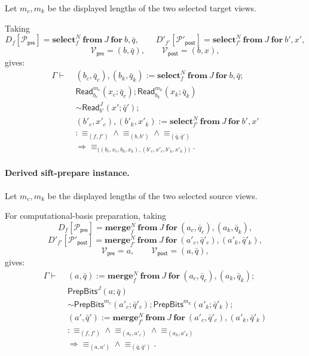 \documentclass[acmsmall,screen,review,anonymous,nonacm]{acmart}
\theoremstyle{defn_style}
\begin{document}
Let \(m_c,m_k\) be the displayed lengths of the two selected target views.

Taking
\[
D_f[\mathcal P_{\mathsf{pre}}]
=
\mathbf{select}_{f}^{N}\ \mathbf{from}\ J\ \mathbf{for}\ b,\bar q,
\qquad
D'_{f'}[\mathcal P'_{\mathsf{post}}]
=
\mathbf{select}_{f'}^{N}\ \mathbf{from}\ J\ \mathbf{for}\ b',x',
\]
\[
\mathcal V_{\mathsf{pre}}=(b,\bar q),
\qquad
\mathcal V_{\mathsf{post}}=(b,x),
\]
gives:
\[
\begin{aligned}
\Gamma
\vdash\;&
(b_c,\bar q_c),(b_k,\bar q_k)
:=
\mathbf{select}_{f}^{N}\ \mathbf{from}\ J\ \mathbf{for}\ b,\bar q;
\\
&
\mathsf{Read}_{b_c}^{m_c}(x_c;\bar q_c);
\mathsf{Read}_{b_k}^{m_k}(x_k;\bar q_k)
\\
&\sim
\mathsf{Read}_{b'}^{J}(x';\bar q');
\\
&
(b'_c,x'_c),(b'_k,x'_k)
:=
\mathbf{select}_{f'}^{N}\ \mathbf{from}\ J\ \mathbf{for}\ b',x'
\\
&:
\equiv_{(f,f')}
\land
\equiv_{(b,b')}
\land
\equiv_{(\bar q,\bar q')}
\\
&\Longrightarrow
\equiv_{\bigl(
(b_c,x_c,b_k,x_k),
(b'_c,x'_c,b'_k,x'_k)
\bigr)} .
\end{aligned}
\]


\paragraph{Derived sift-prepare instance.}

Let \(m_c,m_k\) be the displayed lengths of the two selected source views.

For computational-basis preparation, taking
\[
D_f[\mathcal P_{\mathsf{pre}}]
=
\mathbf{merge}_{f}^{N}\ \mathbf{from}\ J\
\mathbf{for}\ (a_c,\bar q_c),(a_k,\bar q_k),
\]
\[
D'_{f'}[\mathcal P'_{\mathsf{post}}]
=
\mathbf{merge}_{f'}^{N}\ \mathbf{from}\ J\
\mathbf{for}\ (a'_c,\bar q'_c),(a'_k,\bar q'_k),
\]
\[
\mathcal V_{\mathsf{pre}}=a,
\qquad
\mathcal V_{\mathsf{post}}=(a,\bar q),
\]
gives:
\[
\begin{aligned}
\Gamma
\vdash\;&
(a,\bar q)
:=
\mathbf{merge}_{f}^{N}\ \mathbf{from}\ J\
\mathbf{for}\ (a_c,\bar q_c),(a_k,\bar q_k);
\\
&
\mathsf{PrepBits}^{J}(a;\bar q)
\\
&\sim
\mathsf{PrepBits}^{m_c}(a'_c;\bar q'_c);
\mathsf{PrepBits}^{m_k}(a'_k;\bar q'_k);
\\
&
(a',\bar q')
:=
\mathbf{merge}_{f'}^{N}\ \mathbf{from}\ J\
\mathbf{for}\ (a'_c,\bar q'_c),(a'_k,\bar q'_k)
\\
&:
\equiv_{(f,f')}
\land
\equiv_{(a_c,a'_c)}
\land
\equiv_{(a_k,a'_k)}
\\
&\Longrightarrow
\equiv_{(a,a')}
\land
\equiv_{(\bar q,\bar q')} .
\end{aligned}
\]
\end{document}
